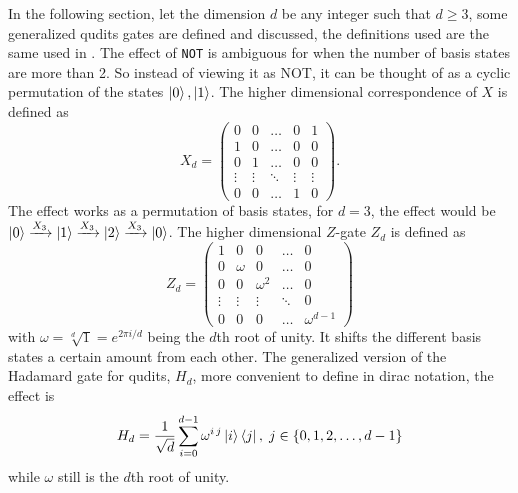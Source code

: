 In the following section, let the dimension $d$ be any integer such that $d \geq 3$, some generalized qudits gates are defined and discussed, the definitions used are the same used in \cite{qudit}.
The effect of {\tt NOT} is ambiguous for when the number of basis states are more than 2. So instead of viewing it as NOT, it can be thought of as a cyclic permutation of the states $\ket{0},\ket{1}$. The higher dimensional correspondence of $X$ is defined as
\begin{equation}
X_d = \begin{pmatrix}
0 & 0 & \dots & 0 & 1\\
1 & 0 & \dots & 0 & 0\\
0 & 1 & \dots & 0 & 0\\
\vdots & \vdots &\ddots& \vdots&\vdots\\
0 & 0& \dots & 1 & 0
\end{pmatrix}.
\end{equation}
The effect works as a permutation of basis states, for $d = 3$, the effect would be $\ket{0} \xrightarrow{X_3} \ket{1} \xrightarrow{X_3} \ket{2} \xrightarrow{X_3} \ket{0}$.
The higher dimensional $Z$-gate $Z_d$ is defined as 
\begin{equation}
Z_d = \begin{pmatrix}
1 & 0 & 0 & \dots & 0 \\
0 & \omega & 0 &\dots & 0\\
0 & 0 & \omega^2&\dots & 0 \\
\vdots & \vdots&\vdots&\ddots& 0\\
0 & 0& 0&\dots  & \omega^{d-1}
\end{pmatrix}
\end{equation}
with $\omega = \sqrt[d]{1} = e^{2\pi i/d}$ being the $d$th root of unity. It shifts the different basis states a certain amount from each other. The generalized version of the Hadamard gate for qudits, $H_d$, more convenient to define in dirac notation, the effect is 
\begin{equation}
H_d = \dfrac{1}{\sqrt{d}}\sum_{i=0}^{d-1} \omega^{i\,j}\ket{i}\bra{j},\; j\in \{0,1,2, \dots, d-1\}
\end{equation}
while $\omega$ still is the $d$th root of unity.

